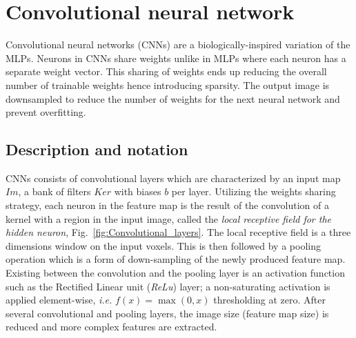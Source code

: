 \documentclass[final, paper=letter,5p,times,twocolumn]{elsarticle}
\begin{document}
\section{Convolutional neural network}

Convolutional neural networks (CNNs) are a biologically-inspired variation of the MLPs. Neurons in CNNs share weights unlike in MLPs where each neuron has a separate weight vector. This sharing of weights ends up reducing the overall number of trainable weights hence introducing sparsity. The output image is downsampled to reduce the number of weights for the next neural network and prevent overfitting.

\subsection{Description and notation}

CNNs consists of convolutional layers which are characterized by an input map $Im$, a bank of filters $Ker$ with biases $b$ per layer. Utilizing the weights sharing strategy, each neuron in the feature map is the result of the convolution of a kernel with a region in the input image, called the {\it local receptive field for the hidden neuron}, Fig.~\ref{fig:Convolutional_layers}. The local receptive field is a three dimensions window on the input voxels. This is then followed by a pooling operation which is a form of down-sampling of the newly produced feature map. Existing between the convolution and the pooling layer is an activation function such as the Rectified Linear unit ({\it ReLu}) layer; a non-saturating activation is applied element-wise, {\it i.e.} $f(x) = \max(0,x)$ thresholding at zero. After several convolutional and pooling layers, the image size (feature map size) is reduced and more complex features are extracted. \\
\end{document}
